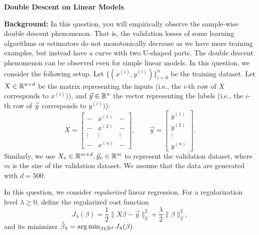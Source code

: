 \item {} {\bf Double Descent on Linear Models}

\textbf{Background: } 
In this question, you will empirically observe the sample-wise double descent phenomenon. That is, the validation losses of some learning algorithms or estimators do not monotonically decrease as we have more training examples, but instead have a curve with two U-shaped parts. The double descent phenomenon can be observed even for simple linear models. In this question, we consider the following setup. Let $\{(x^{(i)},y^{(i)})\}_{i=0}^{n}$ be the training dataset. Let $X\in\mathbb{R}^{n\times d}$ be the matrix representing the inputs (i.e., the $i$-th row of $X$ corresponds to $x^{(i)})$), and $\vec{y}\in\mathbb{R}^{n}$ the vector representing the labels (i.e., the $i$-th row of $\vec{y}$ corresponds to $y^{(i)})$):
$$
X=
\begin{bmatrix}
	- & x^{(1)} & - \\
	- & x^{(2)} & - \\
	\vdots & \vdots & \vdots\\
	- & x^{(n)} & - 
\end{bmatrix},\qquad
\vec{y}=
\begin{bmatrix}
	y^{(1)} \\
	y^{(2)}\\
	\vdots\\
	y^{(n)}
\end{bmatrix}.
$$
Similarly, we use $X_v\in \mathbb{R}^{m\times d}, \vec{y}_v\in \mathbb{R}^{m}$ to represent the validation dataset, where $m$ is the size of the validation dataset. We assume that the data are generated with $d=500$. 

In this question, we consider \emph{regularized} linear regression. For a regularization level $\lambda\ge 0$, define the regularized cost function $$J_\lambda(\beta)=\frac{1}{2}\|X\beta-\vec{y}\|_2^2+\frac{\lambda}{2}\|\beta\|_2^2,$$ and its minimizer $\hat{\beta}_\lambda=\arg\min_{\beta\in \mathbb{R}^{d}}J_\lambda(\beta).$

\begin{enumerate}
 	
	\ifnum{} {
	
} \fi


\ifnum{} {
	
} \fi

	
	\ifnum{} {
	
	} \fi

\end{enumerate}
